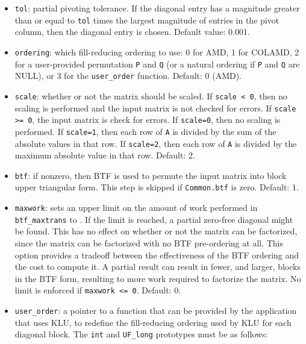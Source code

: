 \documentclass[11pt]{article}
\begin{document}
\begin{itemize}
\item {\tt tol}: partial pivoting tolerance.  If the diagonal entry has a
magnitude greater than or equal to {\tt tol} times the largest magnitude
of entries in the pivot column, then the diagonal entry is chosen.
Default value: 0.001.

\item {\tt ordering}: which fill-reducing ordering to use: 0 for AMD,
1 for COLAMD, 2 for a user-provided permutation {\tt P} and {\tt Q}
(or a natural ordering if {\tt P} and {\tt Q} are NULL), or 3 for
the {\tt user\_order} function.  Default: 0 (AMD).

\item {\tt scale}: whether or not the matrix should be scaled.
If {\tt scale < 0}, then no scaling is performed and the input matrix
is not checked for errors.  If {\tt scale >= 0}, the input matrix is
check for errors.
If {\tt scale=0}, then no scaling is performed.
If {\tt scale=1}, then each row of {\tt A} is divided by the sum of
the absolute values in that row.
If {\tt scale=2}, then each row of {\tt A} is divided by the maximum
absolute value in that row.  Default: 2.

\item {\tt btf}:  if nonzero, then BTF is used to permute the input matrix
into block upper triangular form.  This step is skipped if {\tt Common.btf}
is zero.  Default: 1.

\item {\tt maxwork}: sets an upper limit on the amount of work performed in
{\tt btf\_maxtrans} to .  If the limit is reached,
a partial zero-free diagonal might be found.  This has no effect on whether or
not the matrix can be factorized, since the matrix can be factorized with no
BTF pre-ordering at all.  This option provides a tradeoff between the
effectiveness of the BTF ordering and the cost to compute it.  A partial result
can result in fewer, and larger, blocks in the BTF form, resulting to more work
required to factorize the matrix.  No limit is enforced if {\tt maxwork <= 0}.
Default: 0.

\item {\tt user\_order}: a pointer to a function that can be provided by the
application that uses KLU, to redefine the fill-reducing ordering used by KLU
for each diagonal block.  The {\tt int} and {\tt UF\_long} prototypes must be
as follows:


\end{itemize}
\end{document}
